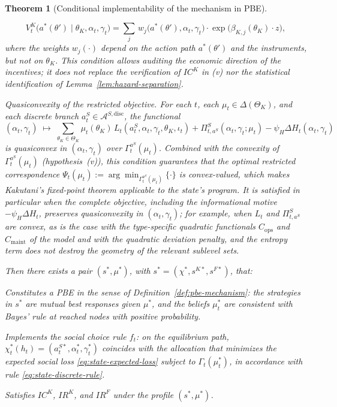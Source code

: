 \documentclass[ecta,nameyear,draft]{econsocart}
\theoremstyle{plain}
\newtheorem{theorem}{Theorem}
\theoremstyle{definition}
\newcommand{\ThetaK}{\Theta_K}
\newcommand{\1}{\mathbf{1}}
\begin{document}
\begin{theorem}[Conditional implementability of the mechanism in PBE]
\begin{list}{}
  \[
    V^K_t\!\bigl(a^\ast(\theta')\mid\theta_K,\alpha_t,\gamma_t\bigr)
    =
    \sum_{j}\,w_j\!\bigl(a^\ast(\theta'),\alpha_t,\gamma_t\bigr)
    \cdot\exp\!\bigl(\beta_{K,j}(\theta_K)\cdot z\bigr),
  \]
  where the weights $w_j(\cdot)$ depend on the action path $a^\ast(\theta')$ and the instruments, but not on $\theta_K$. This condition allows auditing the economic direction of the incentives; it does not replace the verification of $IC^K$ in \textup{(v)} nor the statistical identification of Lemma~\ref{lem:hazard-separation}.
  \item[\textup{(vii)}] Quasiconvexity of the restricted objective. For each $t$, each $\mu_t\in\Delta(\ThetaK)$, and each discrete branch $a_t^S\in\mathcal{A}^{S,\mathrm{disc}}$, the functional
  \[
  (\alpha_t,\gamma_t)\;\mapsto\;\sum_{\theta_K\in\ThetaK}\mu_t(\theta_K)\,L_t(a_t^S,\alpha_t,\gamma_t,\theta_K,\iota_t)
  +\Pi_{t,a^S}^S(\alpha_t,\gamma_t;\mu_t)
  -\psi_H\Delta H_t(\alpha_t,\gamma_t)
  \]
  is quasiconvex in $(\alpha_t,\gamma_t)$ over $\Gamma_t^{a^S}(\mu_t)$. Combined with the convexity of $\Gamma_t^{a^S}(\mu_t)$ \textup{(}hypothesis~\textup{(v)}\textup{)}, this condition guarantees that the optimal restricted correspondence $\Psi_t(\mu_t):=\arg\min_{\Gamma_t^{a^S}(\mu_t)}\{\cdot\}$ is convex-valued, which makes Kakutani's fixed-point theorem applicable to the state's program. It is satisfied in particular when the complete objective, including the informational motive $-\psi_H\Delta H_t$, preserves quasiconvexity in $(\alpha_t,\gamma_t)$; for example, when $L_t$ and $\Pi_{t,a^S}^S$ are convex, as is the case with the type-specific quadratic functionals $C_{\mathrm{ops}}$ and $C_{\mathrm{maint}}$ of the model and with the quadratic deviation penalty, and the entropy term does not destroy the geometry of the relevant sublevel sets.
\end{list}

Then there exists a pair $(s^\ast,\mu^\ast)$, with $s^\ast=({\chi}^\ast,s^{K\ast},s^{F\ast})$, that:
\begin{list}{}{\setlength{\labelwidth}{2.0em}\setlength{\labelsep}{0.7em}\setlength{\leftmargin}{2.7em}\setlength{\itemindent}{0pt}\setlength{\listparindent}{0pt}\setlength{\parsep}{0pt}\setlength{\itemsep}{0.25\baselineskip}}
    \item[\textup{(a)}] Constitutes a PBE in the sense of Definition~\ref{def:pbe-mechanism}: the strategies in $s^\ast$ are mutual best responses given $\mu^\ast$, and the beliefs $\mu_t^\ast$ are consistent with Bayes' rule at reached nodes with positive probability.
    \item[\textup{(b)}] Implements the social choice rule $f_t$: on the equilibrium path, $\chi_t^\ast(h_t)=(a_t^{S\ast},\alpha_t^\ast,\gamma_t^\ast)$ coincides with the allocation that minimizes the expected social loss \eqref{eq:state-expected-loss} subject to $\Gamma_t(\mu_t^\ast)$, in accordance with rule \eqref{eq:state-discrete-rule}.
    \item[\textup{(c)}] Satisfies $IC^K$, $IR^K$, and $IR^F$ under the profile $(s^\ast,\mu^\ast)$.
\end{list}
\end{theorem}
\end{document}
